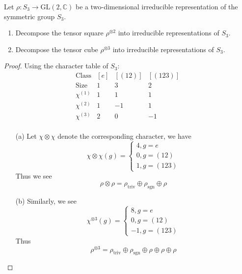 \begin{prob}[F2011-Q4]
    Let \(\rho \colon S_3 \to \mathrm{GL}(2, \mathbb{C})\) be a two-dimensional irreducible representation of the symmetric group \(S_3\). 

\begin{enumerate}
    \item Decompose the tensor square \(\rho^{\otimes 2}\) into irreducible representations of \(S_3\).
    \item Decompose the tensor cube \(\rho^{\otimes 3}\) into irreducible representations of \(S_3\).
\end{enumerate}
\end{prob}
\begin{proof}
    Using the character table of $S_3$:
    \begin{equation*}
        \begin{array}{c|ccc}
            \text{Class} & [e] & [(12)] & [(123)] \\
            \text{Size} & 1 & 3 & 2 \\
            \hline
            \chi^{(1)} & 1 & 1 & 1 \\
            \chi^{(2)} & 1 & -1 & 1 \\
            \chi^{(3)} & 2 & 0 & -1 \\
            \end{array}
    \end{equation*}
    \begin{itemize}
        \item[(a)] Let $\chi\otimes\chi$ denote the corresponding character, we have 
        \begin{equation*}
            \chi\otimes\chi(g)=\begin{cases}
                4, g=e\\
                0, g=(12)\\
                1, g=(123)
            \end{cases}
        \end{equation*}
        Thus we see 
        \begin{equation*}
            \rho\otimes\rho=\rho_{\text{triv}}\oplus\rho_{\text{sgn}}\oplus\rho
        \end{equation*}
        \item[(b)] Similarly, we see 
        \begin{equation*}
            \chi^{\otimes 3}(g)=\begin{cases}
                8, g=e\\
                0, g=(12)\\
                -1, g=(123)
            \end{cases}
        \end{equation*}
        Thus 
        \begin{equation*}
            \rho^{\otimes 3}=\rho_{\text{triv}}\oplus\rho_{\text{sgn}}\oplus\rho\oplus\rho\oplus\rho
        \end{equation*}
    \end{itemize}
\end{proof}

